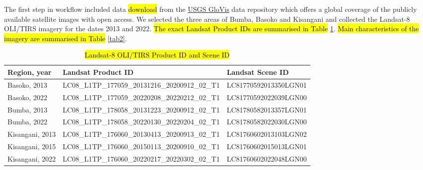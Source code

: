 \documentclass[applsci,article,submit,pdftex,moreauthors]{Definitions/mdpi}
\begin{document}
The first step in workflow included data \hl{download} from the \href{https://glovis.usgs.gov/app}{USGS GloVis} data repository which offers a global coverage of the publicly available satellite images with open access. We selected the three areas of Bumba, Basoko and Kisangani and collected the Landsat-8 OLI/TIRS imagery for the dates 2013 and 2022. \hl{The exact Landsat Product IDs are summarised in Table} \ref{tab1}. \hl{Main characteristics of the imagery are summarised in Table} \ref{tab2}. 
\begin{table}[H] 
\caption{\hl{Landsat-8 OLI/TIRS Product ID and Scene ID} \label{tab1}}
	\begin{tabularx}{\textwidth}{| p{2.3cm} | p{6.3cm} | p{5.3cm} |}
\toprule
\textbf{Region, year} & \textbf{Landsat Product ID} & \textbf{Landsat Scene ID}\\
\midrule
	Basoko, 2013 & LC08\_L1TP\_177059\_20131216\_20200912\_02\_T1 & LC81770592013350LGN01\\
	Basoko, 2022 & LC08\_L1TP\_177059\_20220208\_20220212\_02\_T1 & LC81770592022039LGN00 \\
	Bumba, 2013 & LC08\_L1TP\_178058\_20131223\_20200912\_02\_T1 & LC81780582013357LGN01 \\
	Bumba, 2022 & LC08\_L1TP\_178058\_20220130\_20220204\_02\_T1 & LC81780582022030LGN00 \\
	Kisangani, 2013 & LC08\_L1TP\_176060\_20130413\_20200913\_02\_T1 & LC81760602013103LGN02 \\
	Kisangani, 2015 & LC08\_L1TP\_176060\_20150113\_20200910\_02\_T1 & LC81760602015013LGN01 \\
	Kisangani, 2022 & LC08\_L1TP\_176060\_20220217\_20220302\_02\_T1 & LC81760602022048LGN00 \\
\bottomrule
\end{tabularx}
\end{table}
\end{document}

